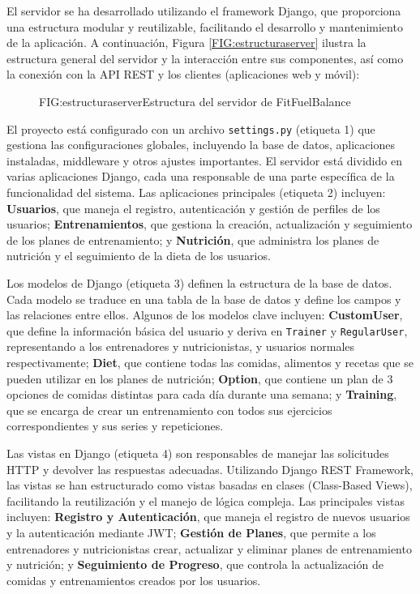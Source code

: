 El servidor se ha desarrollado utilizando el framework Django, que proporciona una estructura modular y reutilizable, facilitando el desarrollo y mantenimiento de la aplicación. A continuación, Figura \ref{FIG:estructuraserver} ilustra la estructura general del servidor y la interacción entre sus componentes, así como la conexión con la API REST y los clientes (aplicaciones web y móvil):

\begin{figure}[Distribución Estructura Servidor]{FIG:estructuraserver}{Estructura del servidor de FitFuelBalance}
\end{figure}

El proyecto está configurado con un archivo \texttt{settings.py} (etiqueta 1) que gestiona las configuraciones globales, incluyendo la base de datos, aplicaciones instaladas, middleware y otros ajustes importantes. El servidor está dividido en varias aplicaciones Django, cada una responsable de una parte específica de la funcionalidad del sistema. Las aplicaciones principales (etiqueta 2) incluyen: \textbf{Usuarios}, que maneja el registro, autenticación y gestión de perfiles de los usuarios; \textbf{Entrenamientos}, que gestiona la creación, actualización y seguimiento de los planes de entrenamiento; y \textbf{Nutrición}, que administra los planes de nutrición y el seguimiento de la dieta de los usuarios.

Los modelos de Django (etiqueta 3) definen la estructura de la base de datos. Cada modelo se traduce en una tabla de la base de datos y define los campos y las relaciones entre ellos. Algunos de los modelos clave incluyen: \textbf{CustomUser}, que define la información básica del usuario y deriva en \texttt{Trainer} y \texttt{RegularUser}, representando a los entrenadores y nutricionistas, y usuarios normales respectivamente; \textbf{Diet}, que contiene todas las comidas, alimentos y recetas que se pueden utilizar en los planes de nutrición; \textbf{Option}, que contiene un plan de 3 opciones de comidas distintas para cada día durante una semana; y \textbf{Training}, que se encarga de crear un entrenamiento con todos sus ejercicios correspondientes y sus series y repeticiones.

Las vistas en Django (etiqueta 4) son responsables de manejar las solicitudes HTTP y devolver las respuestas adecuadas. Utilizando Django REST Framework, las vistas se han estructurado como vistas basadas en clases (Class-Based Views), facilitando la reutilización y el manejo de lógica compleja. Las principales vistas incluyen: \textbf{Registro y Autenticación}, que maneja el registro de nuevos usuarios y la autenticación mediante JWT; \textbf{Gestión de Planes}, que permite a los entrenadores y nutricionistas crear, actualizar y eliminar planes de entrenamiento y nutrición; y \textbf{Seguimiento de Progreso}, que controla la actualización de comidas y entrenamientos creados por los usuarios.

